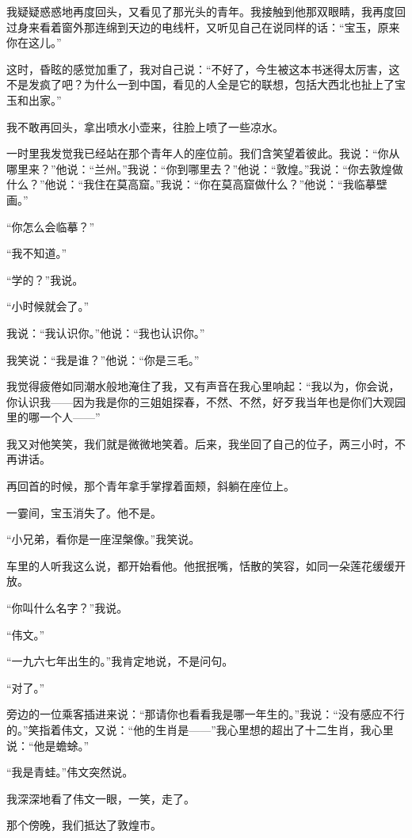 \par 我疑疑惑惑地再度回头，又看见了那光头的青年。我接触到他那双眼睛，我再度回过身来看着窗外那连绵到天边的电线杆，又听见自己在说同样的话：“宝玉，原来你在这儿。”
\par 这时，昏眩的感觉加重了，我对自己说：“不好了，今生被这本书迷得太厉害，这不是发疯了吧？为什么一到中国，看见的人全是它的联想，包括大西北也扯上了宝玉和出家。”
\par 我不敢再回头，拿出喷水小壶来，往脸上喷了一些凉水。
\par 一时里我发觉我已经站在那个青年人的座位前。我们含笑望着彼此。我说：“你从哪里来？”他说：“兰州。”我说：“你到哪里去？”他说：“敦煌。”我说：“你去敦煌做什么？”他说：“我住在莫高窟。”我说：“你在莫高窟做什么？”他说：“我临摹壁画。”
\par “你怎么会临摹？”
\par “我不知道。”
\par “学的？”我说。
\par “小时候就会了。”
\par 我说：“我认识你。”他说：“我也认识你。”
\par 我笑说：“我是谁？”他说：“你是三毛。”
\par 我觉得疲倦如同潮水般地淹住了我，又有声音在我心里响起：“我以为，你会说，你认识我——因为我是你的三姐姐探春，不然、不然，好歹我当年也是你们大观园里的哪一个人——”
\par 我又对他笑笑，我们就是微微地笑着。后来，我坐回了自己的位子，两三小时，不再讲话。
\par 再回首的时候，那个青年拿手掌撑着面颊，斜躺在座位上。
\par 一霎间，宝玉消失了。他不是。
\par 
\par “小兄弟，看你是一座涅槃像。”我笑说。
\par 车里的人听我这么说，都开始看他。他抿抿嘴，恬散的笑容，如同一朵莲花缓缓开放。
\par “你叫什么名字？”我说。
\par “伟文。”
\par “一九六七年出生的。”我肯定地说，不是问句。
\par “对了。”
\par 旁边的一位乘客插进来说：“那请你也看看我是哪一年生的。”我说：“没有感应不行的。”笑指着伟文，又说：“他的生肖是——”我心里想的超出了十二生肖，我心里说：“他是蟾蜍。”
\par “我是青蛙。”伟文突然说。
\par 我深深地看了伟文一眼，一笑，走了。
\par 那个傍晚，我们抵达了敦煌市。
